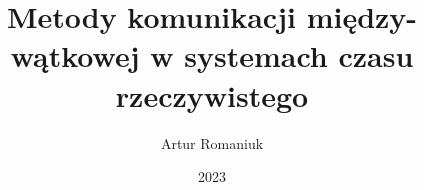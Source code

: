 \documentclass[thesis=inz,faculty=ee]{EE-dyplom}
\title{Metody komunikacji między-wątkowej w systemach czasu rzeczywistego}
\author{Artur Romaniuk}
\date{2023}
\begin{document}
\frontpages



\bibliografia


\acronymslist
\listoffigures
\listoftables
\easyappendices
\end{document}
